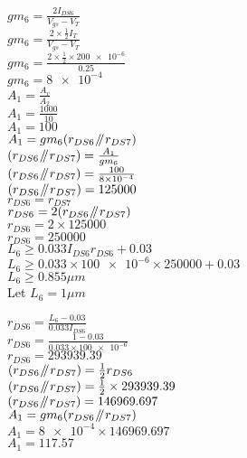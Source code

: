 $gm_{6} = \frac{2I_{DS6}}{V_{gs} - V_{T}}$ \\
$gm_{6} = \frac{2 \times \frac{1}{2}I_{T}}{V_{gs} - V_{T}}$ \\
$gm_{6} = \frac{2 \times \frac{1}{2} \times \num{200e-6}}{0.25}$ \\
$gm_{6} = \num{8e-4}$ \\

$A_{1} = \frac{A_{v}}{A_{2}}$ \\
$A_{1} = \frac{1000}{10}$ \\
$A_{1} = 100$ \\

$A_{1} = gm_{6}(r_{DS6} \mathbin{\!/\mkern-5mu/\!} r_{DS7})$ \\
$(r_{DS6} \mathbin{\!/\mkern-5mu/\!} r_{DS7}) = \frac{A_{1}}{gm_{6}}$ \\
$(r_{DS6} \mathbin{\!/\mkern-5mu/\!} r_{DS7}) = \frac{100}{\num{8e-4}}$ \\
$(r_{DS6} \mathbin{\!/\mkern-5mu/\!} r_{DS7}) = 125000$ \\

$r_{DS6} = r_{DS7}$ \\
$r_{DS6} = 2(r_{DS6} \mathbin{\!/\mkern-5mu/\!} r_{DS7})$ \\
$r_{DS6} = 2 \times 125000$ \\
$r_{DS6} = 250000$ \\

$L_{6} \ge 0.033I_{DS6}r_{DS6} + 0.03$ \\
$L_{6} \ge 0.033 \times \num{100e-6} \times 250000 + 0.03$ \\
$L_{6} \ge 0.855\mu m$ \\

Let $L_{6} = 1\mu m$

$r_{DS6} = \frac{L_{6} - 0.03}{0.033I_{DS6}}$ \\
$r_{DS6} = \frac{1 - 0.03}{0.033 \times \num{100e-6}}$ \\
$r_{DS6} = 293939.39$ \\

$(r_{DS6} \mathbin{\!/\mkern-5mu/\!} r_{DS7}) = \frac{1}{2}r_{DS6}$ \\
$(r_{DS6} \mathbin{\!/\mkern-5mu/\!} r_{DS7}) = \frac{1}{2} \times 293939.39$ \\
$(r_{DS6} \mathbin{\!/\mkern-5mu/\!} r_{DS7}) = 146969.697$ \\

$A_{1} = gm_{6}(r_{DS6} \mathbin{\!/\mkern-5mu/\!} r_{DS7})$ \\
$A_{1} = \num{8e-4} \times 146969.697$ \\
$A_{1} = 117.57$ \\

